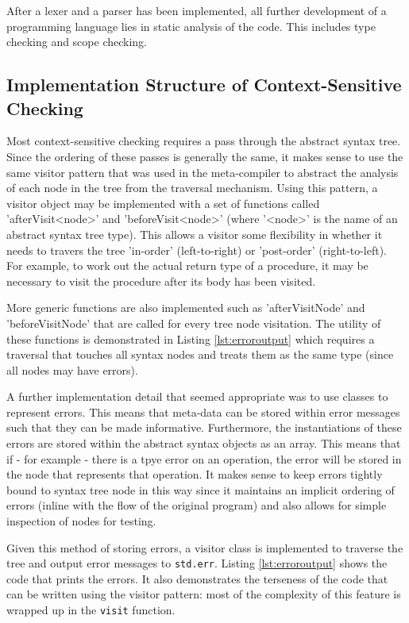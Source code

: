 \documentclass{article}
\begin{document}
After a lexer and a parser has been implemented, all further development of a programming language lies in static analysis of the code. This includes type checking and scope checking.


\subsection{Implementation Structure of Context-Sensitive Checking}

Most context-sensitive checking requires a pass through the abstract syntax tree. Since the ordering of these passes is generally the same, it makes sense to use the same visitor pattern that was used in the meta-compiler to abstract the analysis of each node in the tree from the traversal mechanism. Using this pattern, a visitor object may be implemented with a set of functions called 'afterVisit<node>' and 'beforeVisit<node>' (where '<node>' is the name of an abstract syntax tree type). This allows a visitor some flexibility in whether it needs to travers the tree 'in-order' (left-to-right) or 'post-order' (right-to-left). For example, to work out the actual return type of a procedure, it may be necessary to visit the procedure after its body has been visited.

More generic functions are also implemented such as 'afterVisitNode' and 'beforeVisitNode' that are called for every tree node visitation. The utility of these functions is demonstrated in Listing \ref{lst:erroroutput} which requires a traversal that touches all syntax nodes and treats them as the same type (since all nodes may have errors).

A further implementation detail that seemed appropriate was to use classes to represent errors. This means that meta-data can be stored within error messages such that they can be made informative. Furthermore, the instantiations of these errors are stored within the abstract syntax objects as an array. This means that if - for example - there is a tpye error on an operation, the error will be stored in the node that represents that operation. It makes sense to keep errors tightly bound to syntax tree node in this way since it maintains an implicit ordering of errors (inline with the flow of the original program) and also allows for simple inspection of nodes for testing.

Given this method of storing errors, a visitor class is implemented to traverse the tree and output error messages to \lstinline{std.err}. Listing \ref{lst:erroroutput} shows the code that prints the errors. It also demonstrates the terseness of the code that can be written using the visitor pattern: most of the complexity of this feature is wrapped up in the \lstinline{visit} function.
\end{document}
